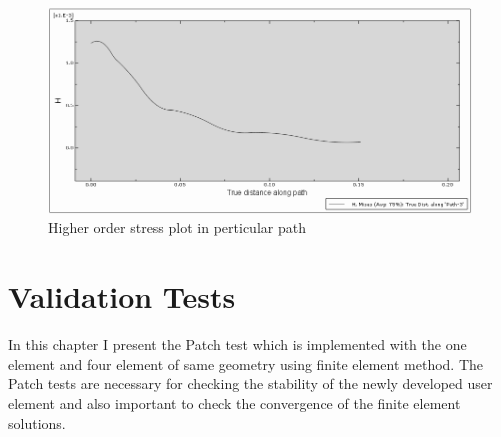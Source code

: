 \documentclass[12pt]{article}
\begin{document}
\begin{figure}[H]
\advance\leftskip-0.5cm
		\includegraphics[scale=0.58]{Higher_order_stress_plot.png} 
 
	\caption{Higher order stress plot in perticular path}
\end{figure}
\newpage
\section{Validation Tests}
In this chapter I present the Patch test which is implemented with the one element and four element of same geometry using finite element method. The Patch tests are necessary for checking the stability of the newly developed user element and also important to check the convergence of the finite element solutions.  
\end{document}
